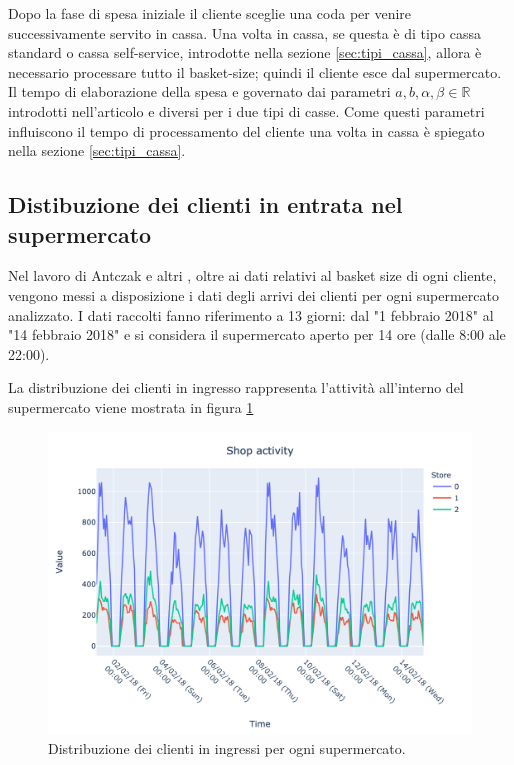 Dopo la fase di spesa iniziale il cliente sceglie una coda per venire successivamente servito in cassa. Una volta in cassa, se questa è di tipo cassa standard o cassa self-service, introdotte nella sezione \ref{sec:tipi_cassa}, allora è necessario processare tutto il basket-size; quindi il cliente esce dal supermercato.  Il tempo di elaborazione della spesa e governato dai parametri $a,b,\alpha ,\beta \in \mathbb{R}$  introdotti nell'articolo \cite{article1} e diversi per i due tipi di casse. Come questi parametri influiscono il tempo di processamento del cliente una volta in cassa è spiegato nella sezione \ref{sec:tipi_cassa}.

\subsection{Distibuzione dei clienti in entrata nel supermercato}
Nel lavoro di Antczak e altri \cite{article1}, oltre ai dati relativi al basket size di ogni cliente, vengono messi a disposizione i dati degli arrivi dei clienti per ogni supermercato analizzato. I dati raccolti fanno riferimento a 13 giorni: dal "1 febbraio 2018" al "14 febbraio 2018" e si considera il supermercato aperto per  14 ore (dalle 8:00 ale 22:00).

La distribuzione dei clienti in ingresso rappresenta l'attività all'interno del supermercato viene mostrata in figura \ref{fig:shop_activity}
 
 
\begin{figure}[H]
	\centering
	\includegraphics[width=14cm]{"images/shop_activity.png"}
	\caption{Distribuzione dei clienti in ingressi per ogni supermercato.}
	\label{fig:shop_activity}
\end{figure}

